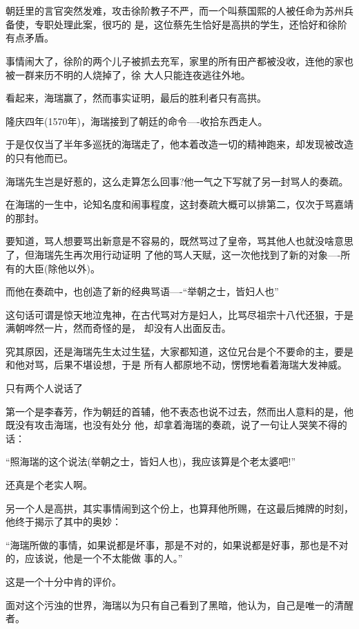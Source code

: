 \documentclass[11pt,a4paper,onecolumn]{article}
\begin{document}
\section[\thesection]{}

朝廷里的言官突然发难，攻击徐阶教子不严，而一个叫蔡国熙的人被任命为苏州兵备使，专职处理此案，很巧的
是，这位蔡先生恰好是高拱的学生，还恰好和徐阶有点矛盾。

事情闹大了，徐阶的两个儿子被抓去充军，家里的所有田产都被没收，连他的家也被一群来历不明的人烧掉了，徐
大人只能连夜逃往外地。

看起来，海瑞赢了，然而事实证明，最后的胜利者只有高拱。

隆庆四年(1570年)，海瑞接到了朝廷的命令----收拾东西走人。

于是仅仅当了半年多巡抚的海瑞走了，他本着改造一切的精神跑来，却发现被改造的只有他而已。

海瑞先生岂是好惹的，这么走算怎么回事?他一气之下写就了另一封骂人的奏疏。

在海瑞的一生中，论知名度和闹事程度，这封奏疏大概可以排第二，仅次于骂嘉靖的那封。

要知道，骂人想要骂出新意是不容易的，既然骂过了皇帝，骂其他人也就没啥意思了，但海瑞先生再次用行动证明
了他的骂人天赋，这一次他找到了新的对象----所有的大臣(除他以外)。

而他在奏疏中，也创造了新的经典骂语----``举朝之士，皆妇人也''

这句话可谓是惊天地泣鬼神，在古代骂对方是妇人，比骂尽祖宗十八代还狠，于是满朝哗然一片，然而奇怪的是，
却没有人出面反击。

究其原因，还是海瑞先生太过生猛，大家都知道，这位兄台是个不要命的主，要是和他对骂，后果不堪设想，于是
所有人都原地不动，愣愣地看着海瑞大发神威。

只有两个人说话了

第一个是李春芳，作为朝廷的首辅，他不表态也说不过去，然而出人意料的是，他既没有攻击海瑞，也没有处分
他，却拿着海瑞的奏疏，说了一句让人哭笑不得的话：

``照海瑞的这个说法(举朝之士，皆妇人也)，我应该算是个老太婆吧!''

还真是个老实人啊。

另一个人是高拱，其实事情闹到这个份上，也算拜他所赐，在这最后摊牌的时刻，他终于揭示了其中的奥妙：

``海瑞所做的事情，如果说都是坏事，那是不对的，如果说都是好事，那也是不对的，应该说，他是一个不太能做
事的人。''

这是一个十分中肯的评价。

面对这个污浊的世界，海瑞以为只有自己看到了黑暗，他认为，自己是唯一的清醒者。
\end{document}

